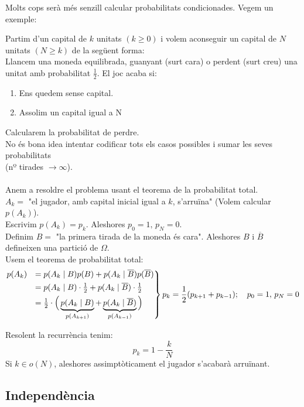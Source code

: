 Molts cops serà més senzill calcular probabilitats condicionades. Vegem un exemple:
\begin{example}
  Partim d'un capital de $k$ unitats $(k \geq 0)$ i volem aconseguir un capital de $N$ unitats $(N\geq k)$ de la següent forma: \\
  Llancem una moneda equilibrada, guanyant (surt cara) o perdent (surt creu) una unitat amb probabilitat $\frac{1}{2}$. El joc acaba si: 
  \begin{enumerate}
      \item Ens quedem sense capital.
      \item Assolim un capital igual a N
  \end{enumerate}
  Calcularem la probabilitat de perdre. \\
  No és bona idea intentar codificar tots els casos possibles i sumar les seves probabilitats \\ (nº tirades $\to \infty$). \\\\
  
  Anem a resoldre el problema usant el teorema de la probabilitat total. \\
  $A_{k} = $ "el jugador, amb capital inicial igual a $k$, s'arruïna" (Volem calcular $p(A_{k})$). \\
  Escrivim $p(A_{k}) = p_{k}$. Aleshores $p_{0} = 1, \, p_{N} = 0$. \\
  Definim $B =$ "la primera tirada de la moneda és cara". Aleshores $B$ i $\overline{B}$ defineixen una partició de $\Omega$. \\
  Usem el teorema de probabilitat total:
  \[
    \begin{rcases}
        p(A_{k}) &= p(A_{k} \mid B)p(B) + p(A_{k}\mid \overline{B})p(\overline{B}) \\
        &= p(A_{k}\mid B)\cdot\frac{1}{2} + p(A_{k}\mid\overline{B})\cdot\frac{1}{2} \\
        &= \frac{1}{2} \cdot\Big( \underbrace{p(A_{k}\mid B)}_{p(A_{k+1})} + \underbrace{p(A_{k}\mid\overline{B})}_{p(A_{k-1})}\Big)
    \end{rcases} p_{k} = \frac{1}{2}(p_{k+1} + p_{k-1}); \quad p_{0} = 1, \, p_{N} = 0
  \]
  
  Resolent la recurrència tenim: 
  \[
    p_{k} = 1 - \frac{k}{N}
  \]
  Si $k \in o(N)$, aleshores assimptòticament el jugador s'acabarà arruïnant.
\end{example}

\subsection{Independència}

